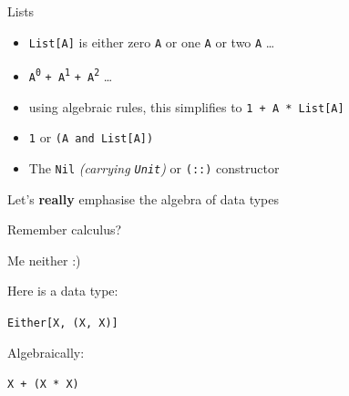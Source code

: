\begin{frame}
\begin{block}{Lists}
\begin{itemize}
  \item<1-> \lstinline{List[A]} is either zero \lstinline{A} or one \lstinline{A} or two \lstinline{A} \ldots
  \item<2-> \lstinline{A}\textsuperscript{\lstinline{0}} \lstinline{+ A}\textsuperscript{\lstinline{1}} \lstinline{+ A}\textsuperscript{\lstinline{2}} \ldots
  \item<3-> using algebraic rules, this simplifies to \lstinline{1 + A * List[A]}
  \item<3-> \lstinline{1} or \lstinline{(A and List[A])}
  \item<3-> The \lstinline{Nil} \emph{(carrying \lstinline{Unit})} or \lstinline{(::)} constructor
\end{itemize}
\end{block}
\end{frame}


\begin{frame}
\begin{center}
Let's \textbf{really} emphasise the algebra of data types
\end{center}
\end{frame}

\begin{frame}
\begin{center}
Remember calculus?
\end{center}
\end{frame}


\begin{frame}
\begin{center}
Me neither :)
\end{center}
\end{frame}


\begin{frame}
\begin{center}
Here is a data type:

\lstinline{Either[X, (X, X)]}
\end{center}
\end{frame}


\begin{frame}
\begin{center}
Algebraically:

\lstinline{X + (X * X)}
\end{center}
\end{frame}


